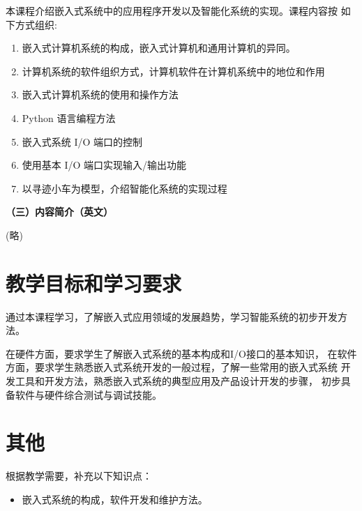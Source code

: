 \documentclass{article}
\begin{document}
    本课程介绍嵌入式系统中的应用程序开发以及智能化系统的实现。课程内容按
    如下方式组织:
 \begin{enumerate}
    \item 嵌入式计算机系统的构成，嵌入式计算机和通用计算机的异同。
    \item 计算机系统的软件组织方式，计算机软件在计算机系统中的地位和作用
    \item 嵌入式计算机系统的使用和操作方法
	\item Python 语言编程方法
    \item 嵌入式系统 I/O 端口的控制
	\item 使用基本 I/O 端口实现输入/输出功能
	\item 以寻迹小车为模型，介绍智能化系统的实现过程
 \end{enumerate}
        
\textbf{（三）内容简介（英文）}

 (略)


\section{教学目标和学习要求}
通过本课程学习，了解嵌入式应用领域的发展趋势，学习智能系统的初步开发方法。

在硬件方面，要求学生了解嵌入式系统的基本构成和I/O接口的基本知识，
在软件方面，要求学生熟悉嵌入式系统开发的一般过程，了解一些常用的嵌入式系统
开发工具和开发方法，熟悉嵌入式系统的典型应用及产品设计开发的步骤，
初步具备软件与硬件综合测试与调试技能。

\section{其他}
   根据教学需要，补充以下知识点：
  \begin{itemize}
   \item 嵌入式系统的构成，软件开发和维护方法。
  \end{itemize}
\end{document}
